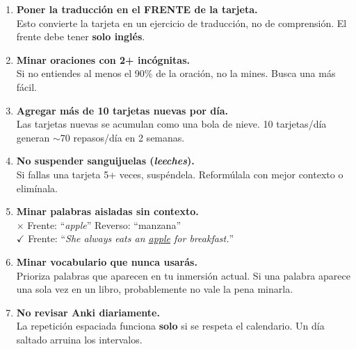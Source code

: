 \documentclass[12pt,a4paper]{article}
\begin{document}
\begin{cajamalo}

\begin{enumerate}[leftmargin=1.2cm]
  \item \textbf{Poner la traducción en el FRENTE de la tarjeta.}\\
    {\small Esto convierte la tarjeta en un ejercicio de traducción, no de comprensión. El frente debe tener \textbf{solo inglés}.}

  \item \textbf{Minar oraciones con 2+ incógnitas.}\\
    {\small Si no entiendes al menos el 90\% de la oración, no la mines. Busca una más fácil.}

  \item \textbf{Agregar más de 10 tarjetas nuevas por día.}\\
    {\small Las tarjetas nuevas se acumulan como una bola de nieve. 10 tarjetas/día generan $\sim$70 repasos/día en 2 semanas.}

  \item \textbf{No suspender sanguijuelas (\textit{leeches}).}\\
    {\small Si fallas una tarjeta 5+ veces, suspéndela. Reformúlala con mejor contexto o elimínala.}

  \item \textbf{Minar palabras aisladas sin contexto.}\\
    {\small $\times$ Frente: ``\textit{apple}'' Reverso: ``manzana'' \\
    $\checkmark$ Frente: ``\textit{She always eats an \underline{apple} for breakfast.}''}

  \item \textbf{Minar vocabulario que nunca usarás.}\\
    {\small Prioriza palabras que aparecen en tu inmersión actual. Si una palabra aparece una sola vez en un libro, probablemente no vale la pena minarla.}

  \item \textbf{No revisar Anki diariamente.}\\
    {\small La repetición espaciada funciona \textbf{solo} si se respeta el calendario. Un día saltado arruina los intervalos.}
\end{enumerate}
\end{cajamalo}

\end{document}
